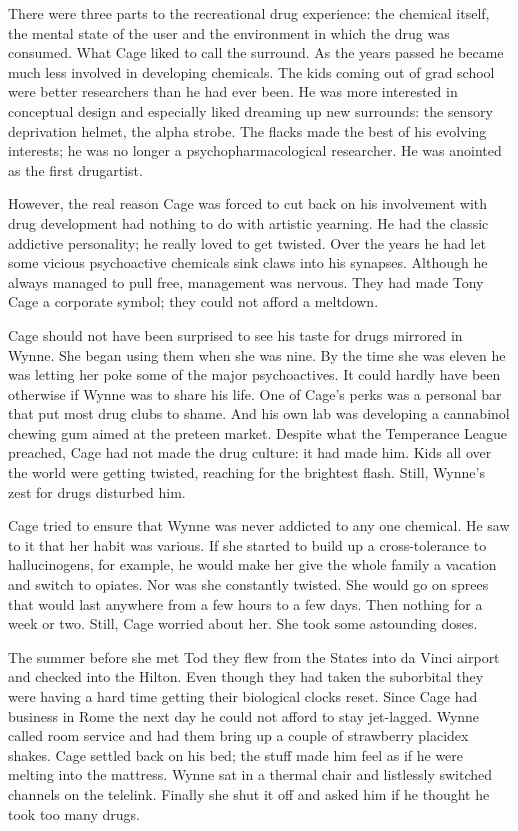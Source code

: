 There were three parts to the recreational drug experience: the chemical itself, the mental state of the user and the environment in which the drug was consumed. What Cage liked to call the surround. As the years passed he became much less involved in developing chemicals. The kids coming out of grad school were better researchers than he had ever been. He was more interested in conceptual design and especially liked dreaming up new surrounds: the sensory deprivation helmet, the alpha strobe. The flacks made the best of his evolving interests; he was no longer a psychopharmacological researcher. He was anointed as the first drugartist.

However, the real reason Cage was forced to cut back on his involvement with drug development had nothing to do with artistic yearning. He had the classic addictive personality; he really loved to get twisted. Over the years he had let some vicious psychoactive chemicals sink claws into his synapses. Although he always managed to pull free, management was nervous. They had made Tony Cage a corporate symbol; they could not afford a meltdown.

Cage should not have been surprised to see his taste for drugs mirrored in Wynne. She began using them when she was nine. By the time she was eleven he was letting her poke some of the major psychoactives. It could hardly have been otherwise if Wynne was to share his life. One of Cage’s perks was a personal bar that put most drug clubs to shame. And his own lab was developing a cannabinol chewing gum aimed at the preteen market. Despite what the Temperance League preached, Cage had not made the drug culture: it had made him. Kids all over the world were getting twisted, reaching for the brightest flash. Still, Wynne’s zest for drugs disturbed him.

Cage tried to ensure that Wynne was never addicted to any one chemical. He saw to it that her habit was various. If she started to build up a cross-tolerance to hallucinogens, for example, he would make her give the whole family a vacation and switch to opiates. Nor was she constantly twisted. She would go on sprees that would last anywhere from a few hours to a few days. Then nothing for a week or two. Still, Cage worried about her. She took some astounding doses.

The summer before she met Tod they flew from the States into da Vinci airport and checked into the Hilton. Even though they had taken the suborbital they were having a hard time getting their biological clocks reset. Since Cage had business in Rome the next day he could not afford to stay jet-lagged. Wynne called room service and had them bring up a couple of strawberry placidex shakes. Cage settled back on his bed; the stuff made him feel as if he were melting into the mattress. Wynne sat in a thermal chair and listlessly switched channels on the telelink. Finally she shut it off and asked him if he thought he took too many drugs.

